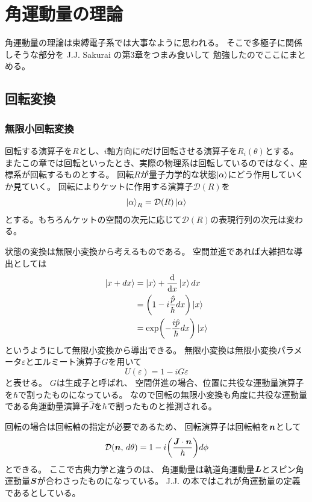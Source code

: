 \documentclass[../../master.tex]{subfiles}
\begin{document}
\chapter{角運動量の理論}
角運動量の理論は束縛電子系では大事なように思われる。
そこで多極子に関係しそうな部分を J.J. Sakurai \cite{JJSakurai} の第3章をつまみ食いして
勉強したのでここにまとめる。

\section{回転変換}
\subsection{無限小回転変換}

回転する演算子を\(R\)とし、\(i\)軸方向に\(\theta\)だけ回転させる演算子を\(R_i(\theta)\)とする。
またこの章では回転といったとき、実際の物理系は回転しているのではなく、座標系が回転するものとする。
回転\(R\)が量子力学的な状態\(\ket{\alpha}\)にどう作用していくか見ていく。
回転によりケットに作用する演算子\(\mathcal{D}(R)\)を
\begin{equation}
    \ket{\alpha}_R = \mathcal{D}(R) \ket{\alpha}
\end{equation}
とする。もちろんケットの空間の次元に応じて\(\mathcal{D}(R)\)の表現行列の次元は変わる。

状態の変換は無限小変換から考えるものである。
空間並進であれば大雑把な導出としては
\begin{align}
    \ket{x+ dx}
    &= \ket{x} + \dv{x}\ket{x} dx \\
    &= \qty(1-i\frac{\hat{p}}{\hbar}dx)\ket{x}\\
    &= \exp(-\frac{i\hat{p}}{\hbar}dx)\ket{x}
\end{align}
というようにして無限小変換から導出できる。
無限小変換は無限小変換パラメータ\(\varepsilon\)とエルミート演算子\(G\)を用いて
\begin{equation}
    U(\varepsilon) = 1-iG\varepsilon
\end{equation}
と表せる。
\(G\)は生成子と呼ばれ、
空間併進の場合、位置に共役な運動量演算子を\(\hbar\)で割ったものになっている。
なので回転の無限小変換も角度に共役な運動量である角運動量演算子\(\hat{J}\)を\(\hbar\)で割ったものと推測される。

回転の場合は回転軸の指定が必要であるため、
回転演算子は回転軸を\(\vb*{n}\)として
\begin{equation}
    \mathcal{D}(\vb*{n},\,d\theta) = 1-i\qty(\frac{\vb*{J}\cdot\vb*{n}}{\hbar})d\phi
\end{equation}
とできる。
ここで古典力学と違うのは、
角運動量は軌道角運動量\(\vb*{L}\)とスピン角運動量\(\vb*{S}\)が合わさったものになっている。
J.J. の本ではこれが角運動量の定義であるとしている。
\end{document}
